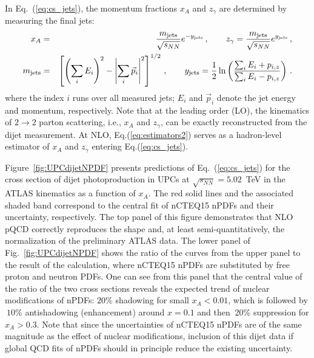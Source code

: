 \documentclass[../report.tex]{subfiles}
\begin{document}
In Eq.~(\ref{eq:cs_jets}), the momentum fractions $x_A$ and $z_{\gamma}$ are determined by measuring the final jets:
\begin{eqnarray}
x_{A} & =& \frac{m_{\rm jets}}{\sqrt{s_{NN}}}e^{-y_{\rm jets}} \,, \quad \quad z_{\gamma}=\frac{m_{\rm jets}}{\sqrt{s_{NN}}}e^{y_{\rm jets}} \,, \nonumber\\
m_{\rm jets} &=& \left[\left(\sum_i E_i\right)^2-\left|\sum_i \vec{p}_i \right|^2 \right]^{1/2} \,, \quad \quad
y_{\rm jets}=\frac{1}{2} \ln \left(\frac{\sum_i E_i+p_{i,z}}{\sum_i E_i-p_{i,z}} \right) \,.
\label{eq:estimators2}
 \end{eqnarray}
 where  the index $i$ runs over all measured jets; $E_i$ and $\vec{p}_i$ denote the jet energy and momentum, respectively.
 Note that at the leading order (LO), the kinematics of $2 \to 2$ parton scattering, i.e., $x_A$ and $z_{\gamma}$, 
 can be exactly reconstructed from the dijet measurement.
 At NLO, Eq.(\ref{eq:estimators2}) serves as a hadron-level estimator of $x_A$ and $z_{\gamma}$
 entering Eq.(\ref{eq:cs_jets}).
 
 Figure~\ref{fig:UPCdijetNPDF}
 presents predictions of Eq.~(\ref{eq:cs_jets}) for the cross section of dijet photoproduction in \PbPb UPCs at $\sqrt{s_{NN}}=5.02$~TeV in the ATLAS kinematics as a function of $x_A$. The red solid lines and the associated shaded band correspond to the central fit of nCTEQ15 nPDFs and their uncertainty, respectively.
The top panel of this figure demonstrates that NLO pQCD correctly reproduces the shape and, at least 
semi-quantitatively, the normalization of the preliminary ATLAS data.  The lower panel of Fig.~\ref{fig:UPCdijetNPDF} %
shows 
the ratio of the curves from the upper panel to the result of the calculation, where nCTEQ15 nPDFs are substituted by 
free proton and neutron PDFs. One can see from this panel that the central value of the ratio of the two cross sections reveals the expected trend of 
nuclear modifications of nPDFs: $20\%$ shadowing for small $x_A < 0.01$, which is followed by $~10\%$ antishadowing (enhancement)
around $x=0.1$ and then $~20\%$ suppression for $x_A > 0.3$.
Note that since the uncertainties of nCTEQ15 nPDFs are of the same magnitude as the effect of nuclear modifications, 
inclusion of this dijet data if global QCD fits of nPDFs should in principle reduce the existing uncertainty.
\end{document}
